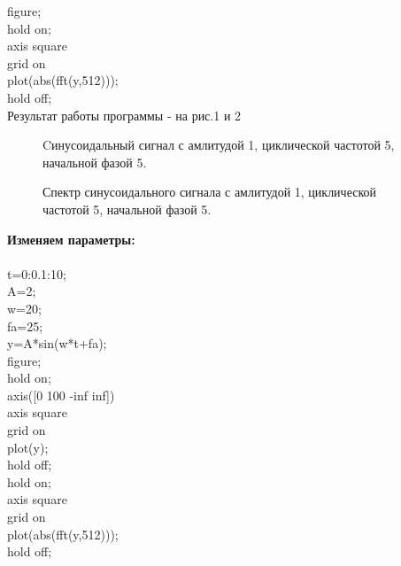 \documentclass[12pt,a4paper]{scrartcl}
\begin{document}
figure;\\
hold on;\\
axis square\\
grid on\\
plot(abs(fft(y,512)));\\
hold off;\\

Результат работы программы - на рис.1 и 2

\newpage
\begin{figure}[h!]
\caption{Cинусоидальный сигнал с амлитудой 1, циклической частотой 5, начальной фазой 5.}
\end{figure}

\begin{figure}[h!]
\caption{Спектр синусоидального сигнала с амлитудой 1, циклической частотой 5, начальной фазой 5.}
\end{figure}

\textbf{Изменяем параметры:\\\\}
t=0:0.1:10;\\
A=2;\\
w=20;\\
fa=25;\\
y=A*sin(w*t+fa);\\
figure;\\
hold on;\\
axis([0 100 -inf inf])\\
axis square\\
grid on\\
plot(y);\\
hold off;\\
hold on;\\
axis square\\
grid on\\
plot(abs(fft(y,512)));\\
hold off;\\
\end{document}
